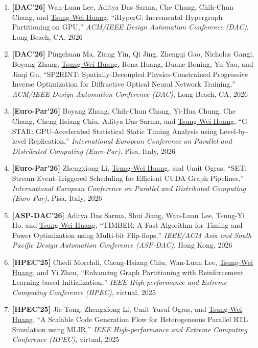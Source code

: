 \documentclass[A4,11pt]{article}
\begin{document}
\begin{enumerate}
    \item \textbf{[DAC'26]} Wan-Luan Lee, Aditya Das Sarma, Che Chang, Chih-Chun Chang, and \underline{Tsung-Wei Huang}, ``iHyperG: Incremental Hypergraph Partitioning on GPU,'' \textit{ACM/IEEE Design Automation Conference (DAC)}, Long Beach, CA, 2026

    \item \textbf{[DAC'26]} Pingchuan Ma, Ziang Yin, Qi Jing, Zhengqi Gao, Nicholas Gangi, Boyang Zhang, \underline{Tsung-Wei Huang}, Rena Huang, Duane Boning, Yu Yao, and Jiaqi Gu, ``SP2RINT: Spatially-Decoupled Physics-Constrained Progressive Inverse Optimization for Diffractive Optical Neural Network Training,'' \textit{ACM/IEEE Design Automation Conference (DAC)}, Long Beach, CA, 2026

    \item \textbf{[Euro-Par'26]} Boyang Zhang, Chih-Chun Chang, Yi-Hua Chung, Che Chang, Cheng-Hsiang Chiu, Aditya Das Sarma, and \underline{Tsung-Wei Huang}, ``G-STAR: GPU-Accelerated Statistical Static Timing Analysis using Level-by-level Replication,'' \textit{International European Conference on Parallel and Distributed Computing (Euro-Par)}, Pisa, Italy, 2026

    \item \textbf{[Euro-Par'26]} Zhengxiong Li, \underline{Tsung-Wei Huang}, and Umit Ogras, ``SET: Stream-Event-Triggered Scheduling for Efficient CUDA Graph Pipelines,'' \textit{International European Conference on Parallel and Distributed Computing (Euro-Par)}, Pisa, Italy, 2026
    
    \item \textbf{[ASP-DAC'26]} Aditya Das Sarma, Shui Jiang, Wan-Luan Lee, Tsung-Yi Ho, and \underline{Tsung-Wei Huang}, ``TIMBER: A Fast Algorithm for Timing and Power Optimization using Multi-bit Flip-flops,'' \textit{IEEE/ACM Asia and South Pacific Design Automation Conference (ASP-DAC)}, Hong Kong, 2026
    
    \item \textbf{[HPEC'25]} Chedi Morchdi, Cheng-Hsiang Chiu, Wan-Luan Lee, \underline{Tsung-Wei Huang}, and Yi Zhou, ``Enhancing Graph Partitioning with Reinforcement Learning-based Initialization,'' \textit{IEEE High-performance and Extreme Computing Conference (HPEC)}, virtual, 2025

    \item \textbf{[HPEC'25]} Jie Tong, Zhengxiong Li, Umit Yusuf Ogras, and \underline{Tsung-Wei Huang}, ``A Scalable Code Generation Flow for Heterogeneous Parallel RTL Simulation using MLIR,'' \textit{IEEE High-performance and Extreme Computing Conference (HPEC)}, virtual, 2025


\end{enumerate}
\end{document}
